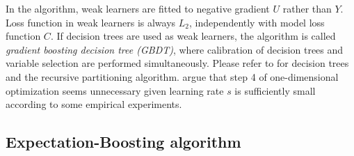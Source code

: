 \documentclass[11pt]{article}
\numberwithin{equation}{section}
\def\bx{\boldsymbol{x}}
\begin{document}
%	

In the algorithm, weak learners are fitted to negative gradient $U$ rather than $Y$.
		 Loss function in weak learners is always $L_2$, independently with model loss function $C$. 
		 If decision trees \citep{breiman1983classification} are used as weak learners, the algorithm is called \textit{gradient boosting decision tree (GBDT)}, where {calibration of decision trees and variable selection} are performed simultaneously.
		 Please refer to \citet{hastie2009elements} for decision trees and the recursive partitioning algorithm.
		\citet{buhlmann2007boosting} argue that step 4 of one-dimensional optimization seems unnecessary given learning rate $s$ is sufficiently small according to some empirical experiments.




\subsection{Expectation-Boosting algorithm}
\end{document}
